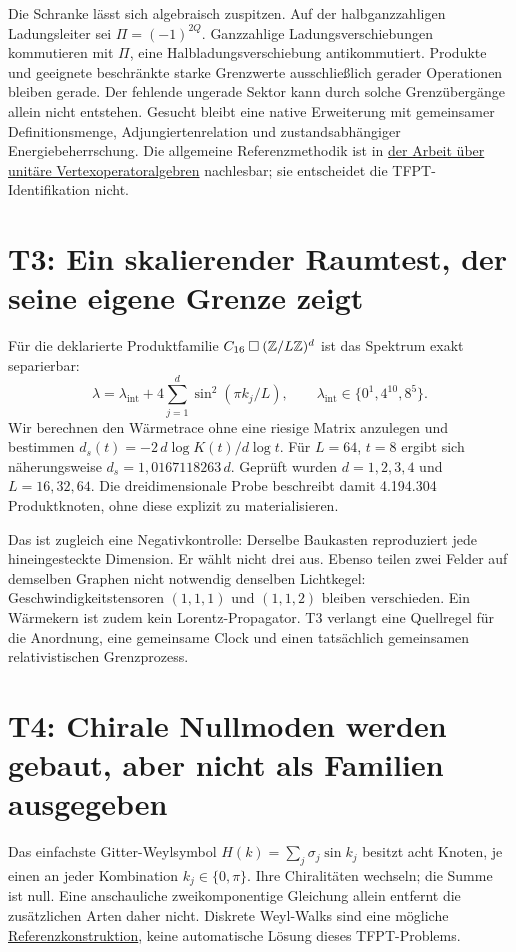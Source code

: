Die Schranke lässt sich algebraisch zuspitzen. Auf der halbganzzahligen Ladungsleiter sei $\Pi=(-1)^{2Q}$. Ganzzahlige Ladungsverschiebungen kommutieren mit $\Pi$, eine Halbladungsverschiebung antikommutiert. Produkte und geeignete beschränkte starke Grenzwerte ausschließlich gerader Operationen bleiben gerade. Der fehlende ungerade Sektor kann durch solche Grenzübergänge allein nicht entstehen. Gesucht bleibt eine native Erweiterung mit gemeinsamer Definitionsmenge, Adjungiertenrelation und zustandsabhängiger Energiebeherrschung. Die allgemeine Referenzmethodik ist in \href{https://arxiv.org/abs/1308.2361}{der Arbeit über unitäre Vertexoperatoralgebren} nachlesbar; sie entscheidet die TFPT-Identifikation nicht.

\section{T3: Ein skalierender Raumtest, der seine eigene Grenze zeigt}
Für die deklarierte Produktfamilie $C_{16}\mathbin{\square}(\mathbb Z/L\mathbb Z)^d$ ist das Spektrum exakt separierbar:
\begin{equation}
\lambda=\lambda_{\mathrm{int}}+4\sum_{j=1}^d\sin^2(\pi k_j/L),\qquad
\lambda_{\mathrm{int}}\in\{0^1,4^{10},8^5\}.
\end{equation}
Wir berechnen den Wärmetrace ohne eine riesige Matrix anzulegen und bestimmen $d_s(t)=-2\,d\log K(t)/d\log t$. Für $L=64$, $t=8$ ergibt sich näherungsweise $d_s=1{,}0167118263\,d$. Geprüft wurden $d=1,2,3,4$ und $L=16,32,64$. Die dreidimensionale Probe beschreibt damit 4.194.304 Produktknoten, ohne diese explizit zu materialisieren.

Das ist zugleich eine Negativkontrolle: Derselbe Baukasten reproduziert jede hineingesteckte Dimension. Er wählt nicht drei aus. Ebenso teilen zwei Felder auf demselben Graphen nicht notwendig denselben Lichtkegel: Geschwindigkeitstensoren $(1,1,1)$ und $(1,1,2)$ bleiben verschieden. Ein Wärmekern ist zudem kein Lorentz-Propagator. T3 verlangt eine Quellregel für die Anordnung, eine gemeinsame Clock und einen tatsächlich gemeinsamen relativistischen Grenzprozess.

\section{T4: Chirale Nullmoden werden gebaut, aber nicht als Familien ausgegeben}
Das einfachste Gitter-Weylsymbol $H(k)=\sum_j\sigma_j\sin k_j$ besitzt acht Knoten, je einen an jeder Kombination $k_j\in\{0,\pi\}$. Ihre Chiralitäten wechseln; die Summe ist null. Eine anschauliche zweikomponentige Gleichung allein entfernt die zusätzlichen Arten daher nicht. Diskrete Weyl-Walks sind eine mögliche \href{https://arxiv.org/abs/1708.00826}{Referenzkonstruktion}, keine automatische Lösung dieses TFPT-Problems.

